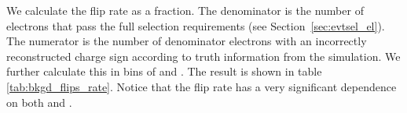 We calculate the flip rate as a fraction. The denominator is the
number of electrons that pass the full selection requirements (see
Section~\ref{sec:evtsel_el}). The numerator is the number of denominator
electrons with an incorrectly reconstructed charge sign according to truth
information from the simulation. We further calculate this in bins of \pt and
\aeta. The result is shown in table \ref{tab:bkgd_flips_rate}. Notice that the
flip rate has a very significant dependence on both \pt and \aeta.
\begin{table}[hbt!]
\begin{center}
\caption[Electron charge-flip rate as a function of \pt and \aeta]
{\label{tab:bkgd_flips_rate}
Electron charge-flip rate as a function of \pt and \aeta.
}
\end{center}
\end{table}

